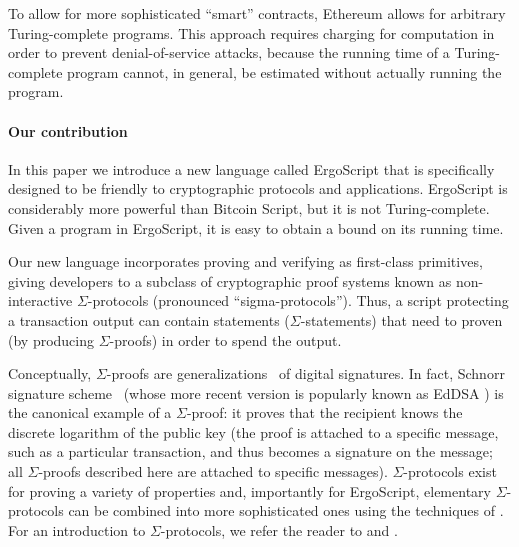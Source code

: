 \documentclass[11pt]{article}
\newcommand{\authnote}[2]{\marginpar{\parbox{\marginparwidth}{\tiny %
  \textsf{#1 {\textcolor{blue}{notes: #2}}}}}%
  \textcolor{blue}{\textbf{\dag}}}
\newcommand{\authnote}[2]{
  \textsf{#1 \textcolor{blue}{: #2}}}
\newcommand{\authnote}[2]{}
\newcommand{\knote}[1]{{\authnote{\textcolor{green}{kushti notes}}{#1}}}
\newcommand{\dnote}[1]{{\authnote{\textcolor{brown}{Dima notes}}{#1}}}
\newcommand{\langname}{ErgoScript\xspace}
\begin{document}
To allow for more sophisticated ``smart'' contracts, Ethereum allows for arbitrary Turing-complete programs. This approach requires charging for computation in order to prevent denial-of-service attacks, because the running time of a Turing-complete program cannot, in general, be estimated without actually running the program.
\dnote{This paragraph us inacurrate due to our last paper https://arxiv.org/abs/1806.10116}


\paragraph{Our contribution}
In this paper we introduce a new language called \langname that is specifically designed to be friendly to cryptographic protocols and applications. \langname is considerably more powerful than Bitcoin Script, but it is not Turing-complete. Given a program in \langname, it is easy to obtain a bound on its running time. \knote{continue}


Our new language incorporates proving and verifying as first-class primitives, giving developers to a subclass of cryptographic proof systems known as non-interactive $\Sigma$-protocols (pronounced ``sigma-protocols'').   Thus, a script protecting a transaction output can contain statements ($\Sigma$-statements) that need to proven (by producing $\Sigma$-proofs) in order to spend the output.

Conceptually, $\Sigma$-proofs \cite{Cra96} are generalizations~\cite{CL06} of digital signatures.
In fact, Schnorr signature scheme~\cite{Sch91} (whose more recent version is popularly known as EdDSA \cite{BDLSY12,rfc8032}) is the canonical example of a $\Sigma$-proof: it proves that the recipient knows the discrete logarithm of the public key (the proof is attached to a specific message, such as a particular transaction, and thus becomes a signature on the message; all $\Sigma$-proofs described here are attached to specific messages). $\Sigma$-protocols exist for proving a variety of properties and, importantly for \langname, elementary $\Sigma$-protocols can be combined into more sophisticated ones using the techniques of \cite{CDS94}. For an introduction to $\Sigma$-protocols, we refer the reader to \cite{Dam10} and \cite[Chapter 6]{HL10}.
\end{document}
